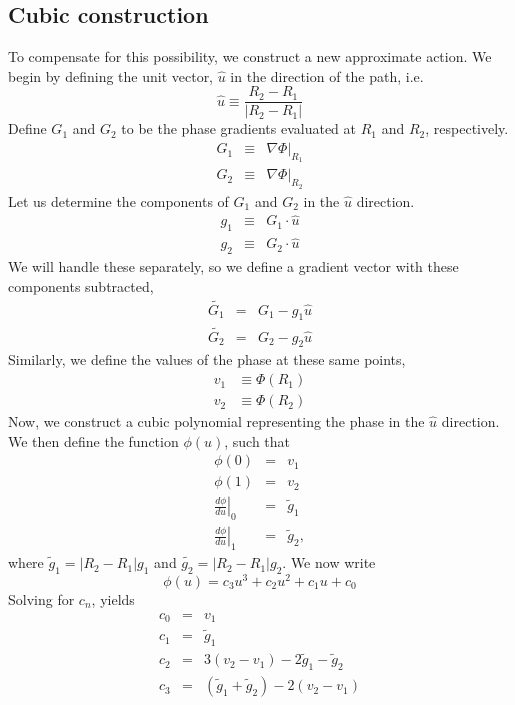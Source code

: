 \documentclass{article}
\begin{document}
\subsection{Cubic construction}
To compensate for this possibility, we construct a new approximate
action.  We begin by defining the unit vector, $\hat{u}$ in the
direction of the path, i.e.
\begin{equation}
\hat{u} \equiv \frac{R_2 - R_1}{|R_2 - R_1|}
\end{equation}
Define $G_1$ and $G_2$ to be the phase gradients evaluated at $R_1$
and $R_2$, respectively.  
\begin{eqnarray}
G_1 & \equiv & \left. \nabla \Phi \right|_{R_1} \\
G_2 & \equiv & \left. \nabla \Phi \right|_{R_2} 
\end{eqnarray}
Let us determine the components of $G_1$ and $G_2$ in the $\hat{u}$
direction.
\begin{eqnarray}
g_1 & \equiv & G_1 \cdot \hat{u} \\
g_2 & \equiv & G_2 \cdot \hat{u}
\end{eqnarray}
We will handle these separately, so we define a gradient vector with
these components subtracted,
\begin{eqnarray}
\tilde{G_1} & = & G_1 - g_1 \hat{u} \\
\tilde{G_2} & = & G_2 - g_2 \hat{u} 
\end{eqnarray}
Similarly, we define the values of the phase at these same points,
\begin{eqnarray}
v_1 & \equiv \Phi(R_1) \\
v_2 & \equiv \Phi(R_2) 
\end{eqnarray}
Now, we construct a cubic polynomial representing the phase in the
$\hat{u}$ direction.  We then define the function $\phi(u)$, such that
\begin{eqnarray}
\phi(0) & = & v_1 \\
\phi(1) & = & v_2 \\
\left.\frac{d\phi}{du}\right|_0 & = & \tilde{g}_1 \\
\left.\frac{d\phi}{du}\right|_1 & = & \tilde{g}_2 ,
\end{eqnarray}
where $\tilde{g}_1 = |R_2-R_1|g_1$ and $\tilde{g_2} = |R_2-R_1| g_2$.
We now write
\begin{equation}
\phi(u) = c_3 u^3 + c_2 u^2 + c_1 u + c_0
\end{equation}
Solving for $c_n$, yields
\begin{eqnarray}
c_0 & = & v_1 \\
c_1 & = & \tilde{g}_1 \\
c_2 & = & 3(v_2-v_1) - 2\tilde{g}_1 -\tilde{g}_2 \\
c_3 & = & (\tilde{g}_1+\tilde{g}_2) - 2(v_2-v_1)
\end{eqnarray}
\end{document}
